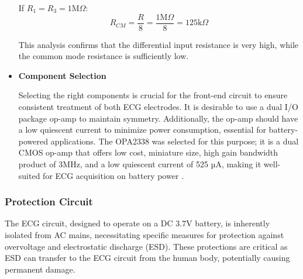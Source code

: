 \begin{itemize}
If \(R_1 = R_3 = 1 \text{M}\Omega\):
\begin{equation}
	R_{CM} = \frac{R}{8} = \frac{1 \text{M}\Omega}{8} = 125 \text{k}\Omega
	\label{eq:final_rcm}
\end{equation}

This analysis confirms that the differential input resistance is very high, while the common mode resistance is sufficiently low.

\item \textbf{Component Selection}

Selecting the right components is crucial for the front-end circuit to ensure consistent treatment of both ECG electrodes. It is desirable to use a dual I/O package op-amp to maintain symmetry. Additionally, the op-amp should have a low quiescent current to minimize power consumption, essential for battery-powered applications. The OPA2338 was selected for this purpose; it is a dual CMOS op-amp that offers low cost, miniature size, high gain bandwidth product of 3MHz, and a low quiescent current of 525 µA, making it well-suited for ECG acquisition on battery power \cite{TI_OPA2338_datasheet}.


\end{itemize}

\subsubsection{Protection Circuit}
\vspace{1em}
The ECG circuit, designed to operate on a DC 3.7V battery, is inherently isolated from AC mains, necessitating specific measures for protection against overvoltage and electrostatic discharge (ESD). These protections are critical as ESD can transfer to the ECG circuit from the human body, potentially causing permanent damage.\\

